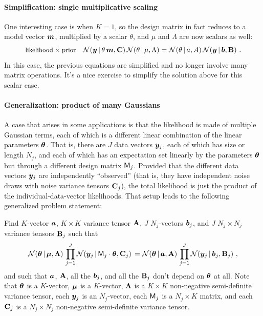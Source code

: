 \paragraph{Simplification: single multiplicative scaling}

One interesting case is when $K=1$, so the design matrix in fact
reduces to a model vector $\boldsymbol{m}$, multiplied by a scalar $\theta$, and
$\mu$ and $\Lambda$ are now scalars as well:
\begin{equation}
\mbox{\small likelihood} \times \mbox{\small prior} \quad \mathcal{N}\!\,(\boldsymbol{y}\,|\,\theta\,\boldsymbol{m},\mathbf{C})\,\mathcal{N}\!\,(\theta\,|\,\mu,\Lambda) = \mathcal{N}\!\,(\theta\,|\, a,A)\,\mathcal{N}\!\,(\boldsymbol{y}\,|\,\boldsymbol{b},\mathbf{B})
~ .
\end{equation}
In this case, the previous equations are simplified and no longer
involve many matrix operations. It's a nice exercise to simplify the
solution above for this scalar case.


\paragraph{Generalization: product of many Gaussians}

A case that arises in some applications is that the
likelihood is made of multiple Gaussian terms, each of which is a
different linear combination of the linear parameters $\boldsymbol{\theta}$.
That is, there are $J$ data vectors $\boldsymbol{y}_j$, each of which has size or length $N_j$,
and each of which has an expectation
set linearly by the parameters $\boldsymbol{\theta}$ but through a different design matrix $\mathsf{M}_j$.
Provided that the different data vectors $\boldsymbol{y}_j$ are independently ``observed'' (that
is, they have independent noise draws with noise variance tensors $\mathbf{C}_j$),
the total likelihood is just the product of
the individual-data-vector likelihoods.
That setup leads to the following generalized problem statement:

Find $K$-vector $\boldsymbol{a}$, $K\times K$ variance tensor $\mathbf{A}$, $J$ $N_j$-vectors $\boldsymbol{b}_j$,
and $J$ $N_j\times N_j$ variance tensors $\mathbf{B}_j$ such that
\begin{equation}\label{eq:genproblem}
\mathcal{N}\!\,(\boldsymbol{\theta}\,|\,\boldsymbol{\mu},\mathbf{\Lambda})\,\prod_{j=1}^J\mathcal{N}\!\,(\boldsymbol{y}_j\,|\,\mathsf{M}_j\cdot\boldsymbol{\theta},\mathbf{C}_j)\,
 = \mathcal{N}\!\,(\boldsymbol{\theta}\,|\,\boldsymbol{a},\mathbf{A})\,\prod_{j=1}^J\mathcal{N}\!\,(\boldsymbol{y}_j\,|\,\boldsymbol{b}_j,\mathbf{B}_j) ~ ,
\end{equation}
and such that $\boldsymbol{a}$, $\mathbf{A}$, all the $\boldsymbol{b}_j$, and all the $\mathbf{B}_j$
don't depend on $\boldsymbol{\theta}$ at all.
Note that
$\boldsymbol{\theta}$ is a $K$-vector,
$\boldsymbol{\mu}$ is a $K$-vector,
$\mathbf{\Lambda}$ is a $K\times K$ non-negative semi-definite variance tensor,
each $\boldsymbol{y}_j$ is an $N_j$-vector,
each $\mathsf{M}_j$ is a $N_j\times K$ matrix,
and
each $\mathbf{C}_j$ is a $N_j\times N_j$ non-negative semi-definite variance tensor.


